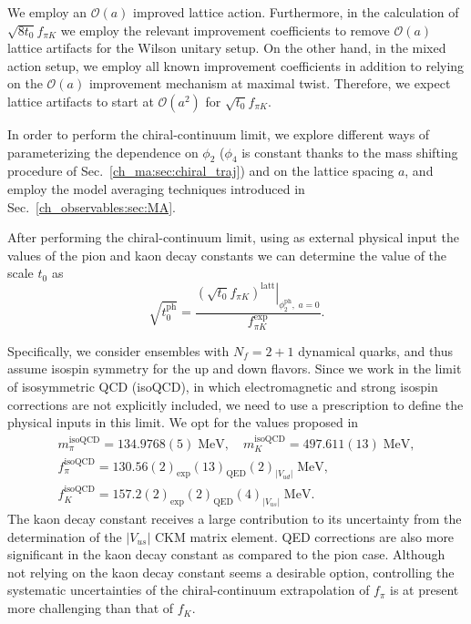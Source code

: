 We employ an $\mathcal{O}(a)$ improved lattice action. Furthermore, in the calculation of $\sqrt{8t_0}f_{\pi K}$ we  employ the relevant improvement coefficients to remove $\mathcal{O}(a)$ lattice artifacts for the Wilson unitary setup. On the other hand, in the mixed action setup, we employ all known improvement coefficients in addition to relying on the $\mathcal{O}(a)$ improvement mechanism at maximal twist. Therefore, we expect lattice artifacts to start at $\mathcal{O}(a^2)$ for $\sqrt{t_0}f_{\pi K}$.

In order to perform the chiral-continuum limit, we explore different ways of parameterizing the dependence on $\phi_2$ ($\phi_4$ is constant thanks to the mass shifting procedure of Sec.~\ref{ch_ma:sec:chiral_traj}) and on the lattice spacing $a$, and employ the model averaging techniques introduced in Sec.~\ref{ch_observables:sec:MA}.

After performing the chiral-continuum limit, using as external physical input the values of the pion and kaon decay constants we can determine the value of the scale $t_0$ as
\begin{equation}
\sqrt{t_0^{\textrm{ph}}}=\frac{\left.\left(\sqrt{t_0}f_{\pi K}\right)^{\textrm{latt}}\right|_
{\phi_2^{\textrm{ph}},\;a=0}}{f_{\pi K}^{\textrm{exp}}}.
\end{equation}

Specifically, we consider ensembles with $N_f=2+1$ dynamical quarks, and thus assume isospin symmetry for the up and down flavors. Since we work in the limit of isosymmetric QCD (isoQCD), in which electromagnetic and strong isospin corrections are not explicitly included, we need to use a prescription to define the physical inputs in this limit. We opt for the values proposed in~\citep{FlavourLatticeAveragingGroupFLAG:2021npn}
\begin{gather}
\label{ch_ss:eq:isoQCD}
m_{\pi}^{\textrm{isoQCD}}=134.9768(5)\;{\textrm{MeV}}, \quad
m_{K}^{\textrm{isoQCD}}=497.611(13)\;{\textrm{MeV}}, \\
\label{ch_ss:eq:isoQCD_fpi}
f_{\pi}^{\textrm{isoQCD}}=130.56(2)_{\textrm{exp}}(13)_{\textrm{QED}}(2)_{|V_{ud}|}\;{\textrm{MeV}}, \quad \\
\label{ch_ss:eq:isoQCD_fk}
f_{K}^{\textrm{isoQCD}}=157.2(2)_{\textrm{exp}}(2)_{\textrm{QED}}(4)_{|V_{us}|}\;{\textrm{MeV}}.
\end{gather} 
The kaon decay constant receives a large contribution to its uncertainty from the determination of the $|V_{us}|$ CKM matrix element. QED corrections are also more significant in the kaon decay constant as compared to the pion case. Although not relying on the kaon decay constant seems a desirable option, controlling the systematic uncertainties of the chiral-continuum extrapolation of $f_{\pi}$ is  at present more challenging than that of $f_K$. 

